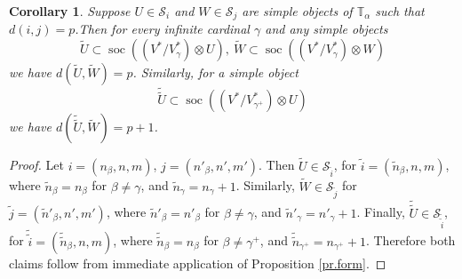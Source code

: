 \documentclass[11pt]{article}
\theoremstyle{plain}
\newtheorem{corollary}[lemma]{Corollary}
\theoremstyle{nonumberplain}
\theoremstyle{plain}
\theoremstyle{nonumberplain}
\newtheorem{proof}{Proof}
\newcommand\bT{\mathbb T}
\newcommand\cS{\mathcal S}
\DeclareMathOperator{\soc}{\mathrm{soc}}
\begin{document}
\begin{corollary}\label{re.defect-ex}
  Suppose $U\in \mathcal{S}_i$ and $W \in \mathcal{S}_j$ are simple objects {of $\bT_\alpha$ such that}
  $d(i,j)=p$.Then for every infinite cardinal $\gamma$ and any simple
  objects
  \begin{equation*}
    \widetilde{U}\subset \soc((V^*/V_\gamma^*)\otimes U),\ \widetilde{W}\subset \soc((V^*/V_\gamma^*)\otimes W)
  \end{equation*}
  we have $d(\widetilde{U},\widetilde{W})=p$. Similarly, for a simple object
  \begin{equation*}
    \widetilde{\widetilde{U}}\subset \soc((V^*/V_{\gamma^+}^*)\otimes U)
  \end{equation*}
  we have $d\left(\widetilde{\widetilde{U}},\widetilde{W}\right)=p+1$.
\end{corollary}
\begin{proof}
  Let $i=\left(n_\beta,n,m\right)$, $j=\left(n'_\beta,n',m'\right)$.
  Then $\widetilde{U}\in \mathcal{S}_{\tilde{i}}$, for
  $\tilde{i}=\left(\tilde{n}_\beta,n,m\right)$, where
  $\tilde{n}_\beta=n_\beta$ for $\beta\neq \gamma$, and
  $\tilde{n}_\gamma=n_\gamma+1$.  Similarly,
  $\widetilde{W}\in \mathcal{S}_{\tilde{j}}$ for
  $\tilde{j}=\left(\tilde{n}'_\beta,n',m'\right)$, where
  $\tilde{n}'_\beta=n'_\beta$ for $\beta\neq \gamma$, and
  $\tilde{n}'_\gamma=n'_\gamma+1$.  Finally,
  $\widetilde{\widetilde{U}}\in \mathcal{S}_{\tilde{\tilde{i}}}$, for
  $\tilde{\tilde{i}}=\left(\tilde{\tilde{n}}_\beta,n,m\right)$, where
  $\tilde{\tilde{n}}_\beta=n_\beta$ for $\beta\neq \gamma^+$,
  and $\tilde{\tilde{n}}_{\gamma^+}=n_{\gamma^+}+1$.
  Therefore both claims follow from immediate application of Proposition \ref{pr.form}.
%
%
%
\end{proof}
\end{document}
